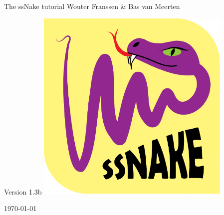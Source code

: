 %
%
%
%

\begin{titlepage}
\begin{center}




{\Huge The ssNake tutorial}
\vfill
\large Wouter Franssen \& Bas van Meerten

\vspace{1cm}
\large Version 1.3b
\vfill
\includegraphics[width=0.7\textwidth]{Images/logo.pdf}\

\vfill
\vfill
{\large \today}

\end{center}

\end{titlepage}
